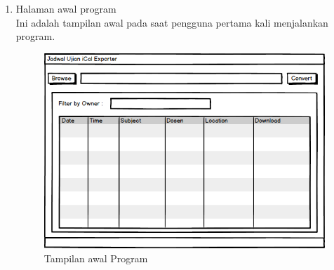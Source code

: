 \begin{enumerate}
	\item Halaman awal program\\
	Ini adalah tampilan awal pada saat pengguna pertama kali menjalankan program.		
	\begin{figure}[H]
		\centering
		\includegraphics[scale=0.5]{Gambar/antarmuka}
		\caption{Tampilan awal Program}
		\label{fig:tampilan_awal}
		\end{figure}
		

\end{enumerate}
